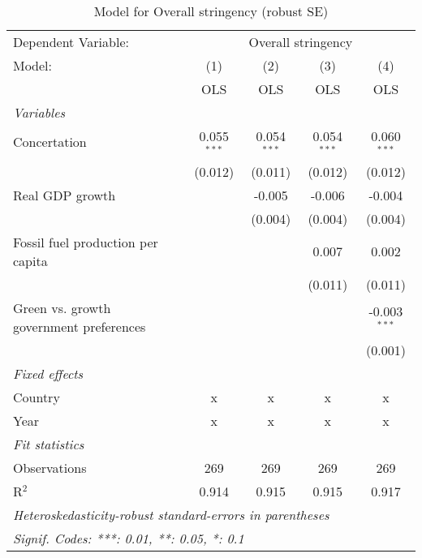 
\begin{table}[htbp]
   \caption{Model for Overall stringency (robust SE)}
   \centering
   \begin{tabular}{lcccc}
      \toprule
      Dependent Variable: & \multicolumn{4}{c}{Overall stringency}\\
      Model:                                  & (1)           & (2)           & (3)           & (4)\\  
                                              &  OLS          & OLS           & OLS           & OLS\\  
      \midrule
      \emph{Variables}\\
      Concertation                            & 0.055$^{***}$ & 0.054$^{***}$ & 0.054$^{***}$ & 0.060$^{***}$\\   
                                              & (0.012)       & (0.011)       & (0.012)       & (0.012)\\   
      Real GDP growth                         &               & -0.005        & -0.006        & -0.004\\   
                                              &               & (0.004)       & (0.004)       & (0.004)\\   
      Fossil fuel production per capita       &               &               & 0.007         & 0.002\\   
                                              &               &               & (0.011)       & (0.011)\\   
      Green vs. growth government preferences &               &               &               & -0.003$^{***}$\\   
                                              &               &               &               & (0.001)\\   
      \emph{Fixed effects}\\
      Country                                 & x             & x             & x             & x\\  
      Year                                    & x             & x             & x             & x\\  
      \midrule \emph{Fit statistics}\\
      Observations                            & 269           & 269           & 269           & 269\\  
      R$^2$                                   & 0.914         & 0.915         & 0.915         & 0.917\\  
      \midrule
      \multicolumn{5}{l}{\emph{Heteroskedasticity-robust standard-errors in parentheses}}\\
      \multicolumn{5}{l}{\emph{Signif. Codes: ***: 0.01, **: 0.05, *: 0.1}}\\
   \end{tabular}
\end{table}


